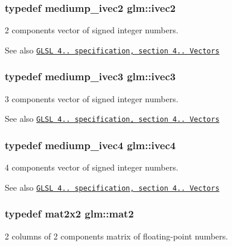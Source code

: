 \subsubsection[{ivec2}]{\setlength{\rightskip}{0pt plus 5cm}typedef mediump\+\_\+ivec2 {\bf glm\+::ivec2}}\label{group__core__types_ga606b9d298d8aaa55c449182c340b4622}
2 components vector of signed integer numbers.

\begin{DoxySeeAlso}{See also}
\href{http://www.opengl.org/registry/doc/GLSLangSpec.4.20.8.pdf}{\tt G\+L\+S\+L 4.. specification, section 4.. Vectors} 
\end{DoxySeeAlso}
\hypertarget{group__core__types_ga620442eba2e3b49317b24fd6d141b0f8}{}
\subsubsection[{ivec3}]{\setlength{\rightskip}{0pt plus 5cm}typedef mediump\+\_\+ivec3 {\bf glm\+::ivec3}}\label{group__core__types_ga620442eba2e3b49317b24fd6d141b0f8}
3 components vector of signed integer numbers.

\begin{DoxySeeAlso}{See also}
\href{http://www.opengl.org/registry/doc/GLSLangSpec.4.20.8.pdf}{\tt G\+L\+S\+L 4.. specification, section 4.. Vectors} 
\end{DoxySeeAlso}
\hypertarget{group__core__types_ga997dbad029105eea19ccd8a1455a6fe3}{}
\subsubsection[{ivec4}]{\setlength{\rightskip}{0pt plus 5cm}typedef mediump\+\_\+ivec4 {\bf glm\+::ivec4}}\label{group__core__types_ga997dbad029105eea19ccd8a1455a6fe3}
4 components vector of signed integer numbers.

\begin{DoxySeeAlso}{See also}
\href{http://www.opengl.org/registry/doc/GLSLangSpec.4.20.8.pdf}{\tt G\+L\+S\+L 4.. specification, section 4.. Vectors} 
\end{DoxySeeAlso}
\hypertarget{group__core__types_ga8357ec0aab6f8cf69313592492663c3f}{}
\subsubsection[{mat2}]{\setlength{\rightskip}{0pt plus 5cm}typedef mat2x2 {\bf glm\+::mat2}}\label{group__core__types_ga8357ec0aab6f8cf69313592492663c3f}
2 columns of 2 components matrix of floating-\/point numbers.

